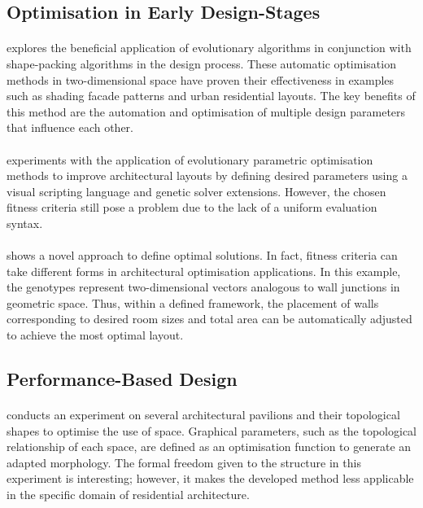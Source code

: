 \documentclass[a4paper, 12pt]{report}
\begin{document}
\subsection*{Optimisation in Early Design-Stages}\label{subsec:optimisation-in-early-design-stages-fr}

\paragraph{\cite{jabi2013potential}} explores the beneficial application of evolutionary algorithms in conjunction with shape-packing algorithms in the design process. These automatic optimisation methods in two-dimensional space have proven their effectiveness in examples such as shading facade patterns and urban residential layouts. The key benefits of this method are the automation and optimisation of multiple design parameters that influence each other.

\paragraph{\cite{boon2015optimizing}} experiments with the application of evolutionary parametric optimisation methods to improve architectural layouts by defining desired parameters using a visual scripting language and genetic solver extensions. However, the chosen fitness criteria still pose a problem due to the lack of a uniform evaluation syntax.

\paragraph{\cite{grzesiak2021evolutionary}} shows a novel approach to define optimal solutions. In fact, fitness criteria can take different forms in architectural optimisation applications. In this example, the genotypes represent two-dimensional vectors analogous to wall junctions in geometric space. Thus, within a defined framework, the placement of walls corresponding to desired room sizes and total area can be automatically adjusted to achieve the most optimal layout.

\subsection*{Performance-Based Design}\label{subsec:performance-based-design-fr}

\paragraph{\cite{ibrahim2011computing}} conducts an experiment on several architectural pavilions and their topological shapes to optimise the use of space. Graphical parameters, such as the topological relationship of each space, are defined as an optimisation function to generate an adapted morphology. The formal freedom given to the structure in this experiment is interesting; however, it makes the developed method less applicable in the specific domain of residential architecture.
\end{document}
